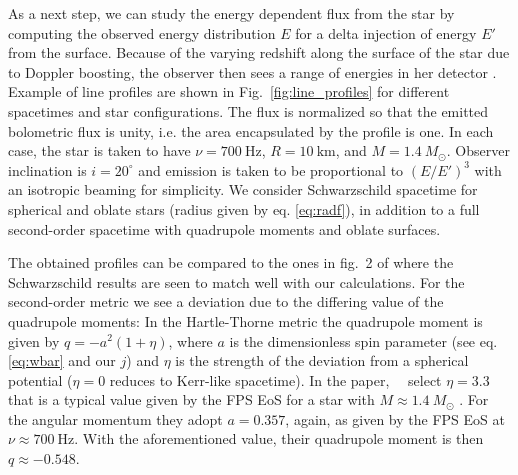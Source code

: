 \documentclass[iop, usenatbib]{emulateapj}
\newcommand{\sch}{Schwarzschild }
\newcommand{\Msun}{\ensuremath{M_{\odot}}}
\begin{document}
As a next step, we can study the energy dependent flux from the star by computing the observed energy distribution $E$ for a delta injection of energy $E'$ from the surface.
Because of the varying redshift along the surface of the star due to Doppler boosting, the observer then sees a range of energies in her detector \citep{OP03,BML06,CMB06}.
Example of line profiles are shown in Fig.~\ref{fig:line_profiles} for different spacetimes and star configurations.
The flux is normalized so that the emitted bolometric flux is unity, i.e. the area encapsulated by the profile is one.
In each case, the star is taken to have $\nu = 700~\mathrm{Hz}$, $R = 10~\mathrm{km}$, and $M=1.4~\Msun$.
Observer inclination is $i=20^{\circ}$ and emission is taken to be proportional to $(E/E')^3$ with an isotropic beaming for simplicity.
We consider \sch spacetime for spherical and oblate stars (radius given by eq. \eqref{eq:radf}), in addition to a full second-order spacetime with quadrupole moments and oblate surfaces.

The obtained profiles can be compared to the ones in fig.~2 of \citealt{BPO13} where the \sch results are seen to match well with our calculations.
For the second-order metric we see a deviation due to the differing value of the quadrupole moments:
In the Hartle-Thorne metric \citep{HT68} the quadrupole moment is given by $q = -a^2 (1 + \eta)$, where $a$ is the dimensionless spin parameter (see eq. \eqref{eq:wbar} and our $j$) and $\eta$ is the strength of the deviation from a spherical potential ($\eta = 0$ reduces to Kerr-like spacetime).
In the paper, \citealt{BPO13}~ select $\eta=3.3$ that is a typical value given by the FPS EoS \citep{FPS} for a star with $M\approx1.4~\Msun$ \citep[see ][]{LP99}.
For the angular momentum they adopt $a = 0.357$, again, as given by the FPS EoS at $\nu \approx 700~\mathrm{Hz}$.
With the aforementioned value, their quadrupole moment is then $q \approx -0.548$.
\end{document}
